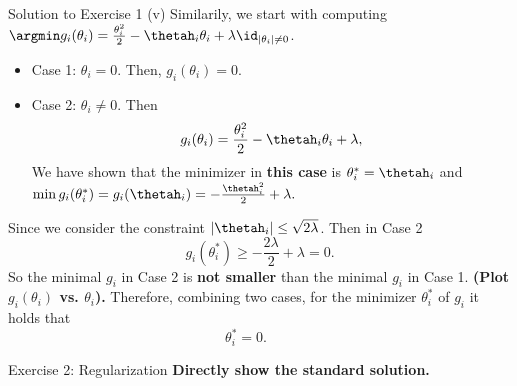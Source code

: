 \documentclass[aspectratio=169]{beamer}
\newcommand{\thetahi}{\thetah_i}
\newcommand{\thetai}{\theta_i}
\newcommand{\thetainnz}{\id_{|\theta_i| \neq 0}}
\begin{document}
\begin{frame}{Solution to Exercise 1 (v)}
	\small
	Similarily, we start with computing $\argmin g_i(\thetai) = \frac{\thetai^2}{2} - \thetahi \thetai + \lambda \thetainnz$.
	\begin{itemize}
		\item Case 1: $\thetai = 0$. Then, $g_i(\thetai) = 0$.
		\item Case 2: $\thetai \neq 0$. Then
			\begin{align*}
				g_i(\theta_i) = \frac{\thetai^2}{2} - \thetahi \thetai + \lambda,
			\end{align*}
		We have shown that the minimizer in \textbf{this case} is $\theta_i^* = \thetahi$ and $ \min g_i(\thetai^*) = g_i(\thetahi) = - \frac{\thetahi^2}{2} + \lambda.$
	\end{itemize}
	Since we consider the constraint $|\thetahi| \leq \sqrt{2\lambda}$. Then in Case 2  $$g_i(\theta_i^*) \geq - \frac{2\lambda}{2} + \lambda = 0.$$
	So the minimal $g_i$ in Case 2 is \textbf{not smaller} than the minimal $g_i$ in Case 1. \textbf{(Plot $g_i(\theta_i)$ vs. $\theta_i$).}
	Therefore, combining two cases, for the minimizer $\thetai^*$ of $g_i$ it holds that $$\thetai^* = 0. \qquad$$
\end{frame}

\begin{frame}{Exercise 2: Regularization}
	\textbf{Directly show the standard solution.}
\end{frame}
\end{document}
